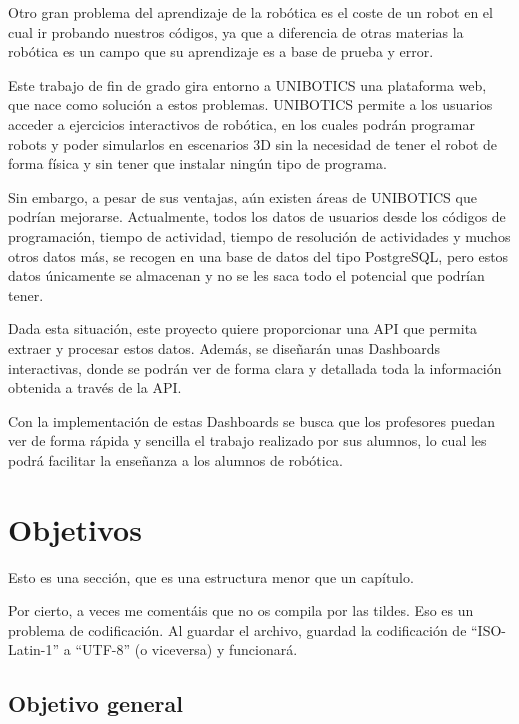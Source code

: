 \documentclass[a4paper, 12pt]{book}
\begin{document}
Otro gran problema del aprendizaje de la robótica es el coste de un robot en el cual ir probando nuestros códigos, ya que a diferencia de otras materias la robótica es un campo que su aprendizaje es a base de prueba y error.

Este trabajo de fin de grado gira entorno a UNIBOTICS una plataforma web, que nace como solución a estos problemas. UNIBOTICS permite a los usuarios acceder a ejercicios interactivos de robótica, en los cuales podrán programar robots y poder simularlos en escenarios 3D sin la necesidad de tener el robot de forma física y sin tener que instalar ningún tipo de programa.

Sin embargo, a pesar de sus ventajas, aún existen áreas de UNIBOTICS que podrían mejorarse. Actualmente, todos los datos de  usuarios desde los códigos de programación, tiempo de actividad, tiempo de resolución de actividades y muchos otros datos más, se recogen en una base de datos del tipo PostgreSQL, pero estos datos únicamente se almacenan y no se les saca todo el potencial que podrían tener.

Dada esta situación, este proyecto quiere proporcionar una API que permita extraer y procesar estos datos. Además, se diseñarán unas Dashboards interactivas, donde se podrán ver de forma clara y detallada toda la información obtenida a través de la API.

Con la implementación de estas Dashboards se busca que los profesores puedan ver de forma rápida y sencilla el trabajo realizado por sus alumnos, lo cual les podrá facilitar la enseñanza a los alumnos de robótica.

\section{Objetivos}
\label{sec:seccion}

Esto es una sección, que es una estructura menor que un capítulo. 

Por cierto, a veces me comentáis que no os compila por las tildes.
Eso es un problema de codificación.
Al guardar el archivo, guardad la codificación de ``ISO-Latin-1'' a ``UTF-8'' (o viceversa) y funcionará.

\subsection{Objetivo general} %
\label{sec:objetivo-general} %
\end{document}
